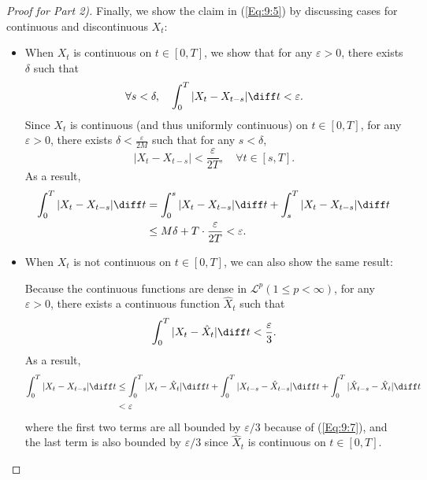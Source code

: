 \begin{proof}[Proof for Part 2)]
Finally, we show the claim in (\ref{Eq:9:5}) by discussing cases for continuous and discontinuous $X_t$:
\begin{itemize}
\item
When $X_t$ is continuous on $t\in[0,T]$, we show that for any $\varepsilon>0$, there exists $\delta$ such that
\[
\forall s<\delta,\quad
\int_0^T|X_t - X_{t-s}|\diff t<\varepsilon.
\]
Since $X_t$ is continuous (and thus uniformly continuous) on $t\in[0,T]$, for any $\varepsilon>0$, there exists $\delta<\frac{\varepsilon}{2M}$ such that for any $s<\delta$,
\[
|X_t - X_{t-s}|<\frac{\varepsilon}{2T},\quad\forall t\in[s,T].
\]
As a result,
\begin{align*}
\int_0^T|X_t - X_{t-s}|\diff t&=\int_0^s|X_t - X_{t-s}|\diff t+\int_s^T|X_t - X_{t-s}|\diff t
\\&\le M\delta + T\cdot\frac{\varepsilon}{2T}<\varepsilon.
\end{align*}
\item
When $X_t$ is not continuous on $t\in[0,T]$, we can also show the same result:

Because the continuous functions are dense in $\mathcal{L}^p (1\le p<\infty)$, for any $\varepsilon>0$, there exists a continuous function $\hat{X}_t$ such that 
\begin{equation}\label{Eq:9:7}
\int_0^T|X_t - \hat{X}_t|\diff t<\frac{\varepsilon}{3}.
\end{equation}
As a result,
\begin{align*}
\int_0^T|X_t - X_{t-s}|\diff t&\le \int_0^T|X_t - \hat{X}_t|\diff t+
\int_0^T|X_{t-s} - \hat{X}_{t-s}|\diff t
+
\int_0^T|\hat{X}_{t-s} - \hat{X}_t|\diff t\\&<\varepsilon
\end{align*}
where the first two terms are all bounded by $\varepsilon/3$ because of (\ref{Eq:9:7}), and the last term is also bounded by $\varepsilon/3$ since $\hat{X}_t$ is continuous on $t\in[0,T]$.
\end{itemize}
\end{proof}

